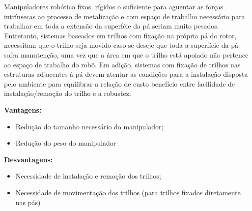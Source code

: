Manipuladores robótico fixos, rígidos o suficiente para aguentar as forças intrínsecas ao
processo de metalização e com espaço de trabalho necessário para trabalhar em
toda a extensão da superfćie da pá seriam muito pesados.
Entretanto, sistemas baseados em trilhos com fixação na própria pá do rotor, necessitam que
o trilho seja movido caso se deseje que toda a superfície da pá sofra
manutenção, uma vez que a área em que o trilho está apoiado não pertence ao espaço de
trabalho do robô. Em adição, sistemas com fixação de trilhos nas estruturas
adjacentes à pá devem atentar as condições para a instalação disposta pelo
ambiente para equilibrar a relação de custo benefício entre facilidade de
instalação/remoção do trilho e a robustez.

\textbf{Vantagens:}
\begin{itemize}
  \item Redução do tamanho necessário do manipulador;
  \item Redução do peso do manipulador
\end{itemize}

\textbf{Desvantagens:}
\begin{itemize}
  \item Necessidade de instalação e remoção dos trilhos;
  \item Necessidade de movimentação dos trilhos (para trilhos fixados
  diretamente nas pás)
\end{itemize}



